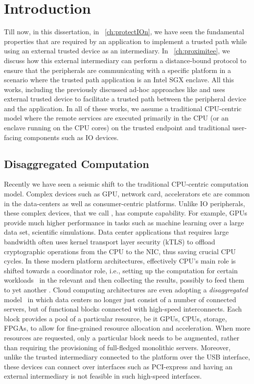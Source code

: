\section{Introduction}
\label{sec: intro}


Till now, in this dissertation, in \protection~\ref{ch:protectIOn}, we have seen the fundamental properties that are required by an application to implement a trusted path while using an external trusted device as an intermediary. In \proximitee~\ref{ch:proximitee}, we  discuss how this external intermediary can perform a distance-bound protocol to ensure that the peripherals are communicating with a specific platform in a scenario where the trusted path application is an Intel SGX enclave. All this works, including the previously discussed ad-hoc approaches like \integrikey and \integriscreen uses external trusted device to facilitate a trusted path between the peripheral device and the application. In all of these works, we assume a traditional CPU-centric model where the remote services are executed primarily in the CPU (or an enclave running on the CPU cores) on the trusted endpoint and traditional user-facing components such as IO devices.

\subsection{Disaggregated Computation}

Recently we have seen a seismic shift to the traditional CPU-centric computation model. Complex devices such as GPU, network card, accelerators etc are common in the data-centers as well as consumer-centric platforms. Unlike IO peripherals, these complex devices, that we call \sphw, has compute capability. For example, GPUs provide much higher performance in tasks such as machine learning over a large data set, scientific simulations. Data center applications that requires large bandwidth often uses kernel transport layer security (kTLS) to offload cryptographic operations from the CPU to the NIC, thus saving crucial CPU cycles. In these modern platform architectures, effectively CPU's main role is shifted towards a coordinator role, i.e., setting up the computation for certain workloads~\cite{spec_hw_acc} in the relevant \sphw and then collecting the results, possibly to feed them to yet another \sphw. Cloud computing architectures are even adopting a \emph{disaggregated} model~\cite{disaggregatedcomp,fungible,meyer2017disaggregated,lim2009disaggregated} in which data centers no longer just consist of a number of connected servers, but of functional blocks connected with high-speed interconnects. Each block provides a pool of a particular resource, be it GPUs, CPUs, storage, FPGAs, to allow for fine-grained resource allocation and acceleration. When more resources are requested, only a particular block needs to be augmented, rather than requiring the provisioning of full-fledged monolithic servers. Moreover, unlike the trusted intermediary connected to the platform over the USB interface, these \sphw devices can connect over interfaces such as PCI-express and having an external intermediary is not feasible in such high-speed interfaces. 


